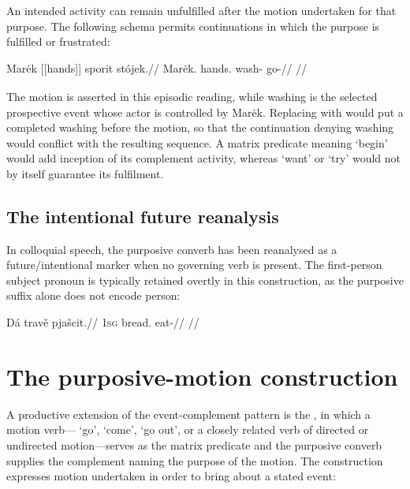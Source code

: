 An intended activity can remain unfulfilled after the motion undertaken
for that purpose. The following schema permits continuations in which the
purpose is fulfilled or frustrated:

\ex\label{ex:slot-purpose-outcome}%
\begingl
\gla Marėk \textnormal{[[hands]]}\textsubscript{\Ind{}} sporit stójek.//
\glb Marėk.\Dir{} hands.\Ind{} wash-\Purp{} go-\Pf{}//
\glft {}
//
\endgl
\xe

The motion is asserted in this episodic reading, while washing is the
selected prospective event whose actor is controlled by Marėk. Replacing
 with  would put a completed washing before the motion,
so that the continuation denying washing would conflict with the resulting
sequence. A matrix predicate meaning `begin' would add inception of its
complement activity, whereas `want' or `try' would not by itself guarantee
its fulfilment.

\subsection{The intentional future reanalysis}\label{sec:purp-intentional}

In colloquial speech, the purposive converb has been reanalysed as a
future/intentional marker when no governing verb is present. The first-person
subject pronoun  is typically retained overtly in this construction, as
the purposive suffix alone does not encode person:

\ex
\begingl
\gla Dá travě pjašcit.//
\glb \textsc{1sg} bread.\Ind{} eat-\Purp{}//
\glft {} //
\endgl
\xe

\section{The purposive-motion construction}\label{sec:purp-motion}

A productive extension of the event-complement pattern is the
, in which a motion verb--- `go',
 `come',  `go out', or a closely related verb of directed
or undirected motion---serves as the matrix predicate and the purposive converb
supplies the complement naming the purpose of the motion. The construction
expresses motion undertaken in order to bring about a stated event:

